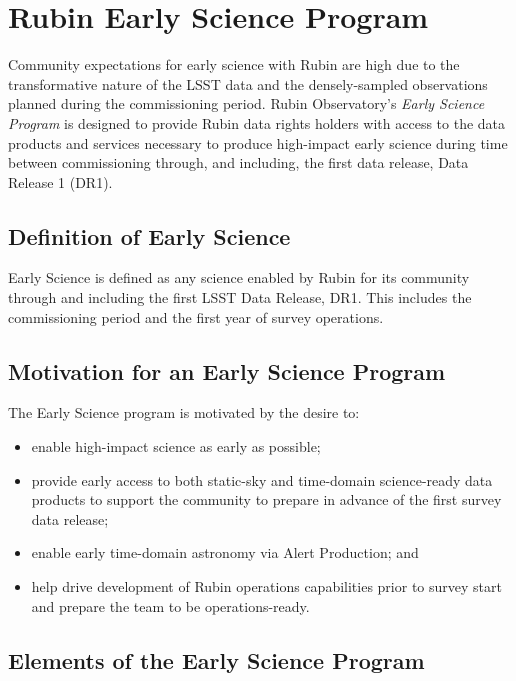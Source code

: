 \section{Rubin Early Science Program}

Community expectations for early science with Rubin are high due to the transformative nature of the LSST data and the densely-sampled observations planned during the commissioning period.
Rubin Observatory's \emph{Early Science Program} is designed to provide Rubin data rights holders with access to the data products and services necessary to produce high-impact early science during time between commissioning through, and including, the first data release, Data Release 1 (DR1). 

\subsection{Definition of Early Science}  \label{ssec:defn}
Early Science is defined as any science enabled by Rubin for its community through and including the first LSST Data Release, DR1.
 This includes the commissioning period and the first year of survey operations.

\subsection{Motivation for an Early Science Program}  \label{ssec:motivation}

The Early Science program is motivated by the desire to:
\begin{itemize}
\item enable high-impact science as early as possible;
\item provide early access to both static-sky and time-domain science-ready data products to support the community to prepare in advance of the first survey data release;
\item enable early time-domain astronomy via Alert Production; and 
\item help drive development of Rubin operations capabilities prior to survey start and prepare the team to be operations-ready.
\end{itemize}

\subsection{Elements of the Early Science Program}

